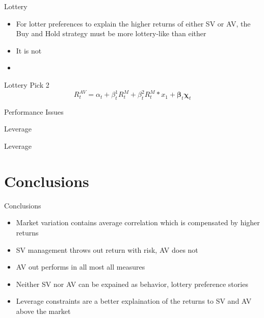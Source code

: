 \documentclass{beamer}
\begin{document}
\begin{frame}{Lottery}
	\begin{itemize}[<+->]
		\item For lotter preferences to explain the higher returns of either SV or AV, the Buy and Hold strategy must be more lottery-like than either
		\item It is not
		\item 	\begin{adjustbox}{width=\textwidth}
			
		\end{adjustbox}
	\end{itemize}
\end{frame}

\begin{frame}{Lottery Pick 2}
		\begin{equation}
		R^{AV}_{t} = \alpha_{t} + \beta^{1}_{t} R^{M}_{t} + \beta^{2}_{t} R^{M}_{t}*x_{1} + \boldsymbol{\beta}_{t}\boldsymbol{\chi}_{t}
		\end{equation}
		\begin{adjustbox}{width=\textwidth,height=4cm}
			
		\end{adjustbox}
\end{frame}

\begin{frame}{Performance Issues}
	\begin{adjustbox}{width=\textwidth}
		
	\end{adjustbox}
\end{frame}

\begin{frame}{Leverage}
	\begin{adjustbox}{width=\textwidth,height=4cm}
		
	\end{adjustbox}
\end{frame}

\begin{frame}{Leverage}
	\begin{adjustbox}{width=\textwidth,height=4cm}
		
	\end{adjustbox}
\end{frame}

\section{Conclusions}
\begin{frame}{Conclusions}
\begin{itemize}[<+->]
\item Market variation contains average correlation which is compensated by higher returns
\item SV management throws out return with risk, AV does not
\item AV out performs in all most all measures
\item Neither SV nor AV can be expained as behavior, lottery preference stories
\item Leverage constraints are a better explaination of the returns to SV and AV above the market
\end{itemize}
\end{frame}
\end{document}
